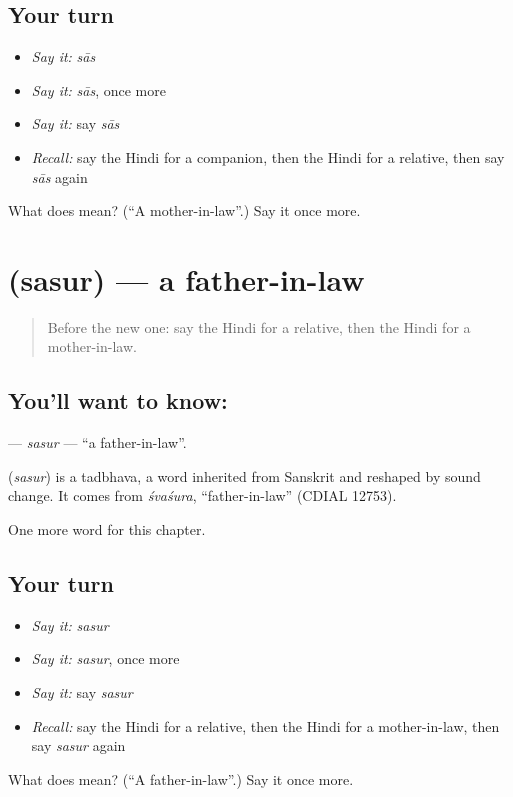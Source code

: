 \subsection*{Your turn}
\begin{itemize}
\raggedright
  \item \emph{Say it:} \emph{sās}
  \item \emph{Say it:} \emph{sās}, once more
  \item \emph{Say it:} say \emph{sās}
  \item \emph{Recall:} say the Hindi for a companion, then the Hindi for a relative, then say \emph{sās} again
\end{itemize}

\begin{tcolorbox}[breakable,colback=teal!4,colframe=teal!35!black,title={Before you move on}]
What does  mean? (\textquotedblleft{}A mother-in-law\textquotedblright{}.) Say it once more.
\end{tcolorbox}
\section[\texorpdfstring{\hi{ससुर} (sasur)}{ससुर (sasur)}]{ (sasur) — a father-in-law}

\label{lesson:HI-C254-sasur}



\begin{quote}
Before the new one: say the Hindi for a relative, then the Hindi for a mother-in-law.
\end{quote}

\subsection*{You'll want to know: }
\textbf{} — \emph{sasur} — \textquotedblleft{}a father-in-law\textquotedblright{}.

\begin{cousinweb}
\textbf{} (\emph{sasur}) is a tadbhava, a word inherited from Sanskrit and reshaped by sound change. It comes from \emph{śvaśura}, \textquotedblleft{}father-in-law\textquotedblright{} (CDIAL 12753).
\end{cousinweb}

\begin{grammarlens}[title={What you've built}]
One more word for this chapter.
\end{grammarlens}

\subsection*{Your turn}
\begin{itemize}
\raggedright
  \item \emph{Say it:} \emph{sasur}
  \item \emph{Say it:} \emph{sasur}, once more
  \item \emph{Say it:} say \emph{sasur}
  \item \emph{Recall:} say the Hindi for a relative, then the Hindi for a mother-in-law, then say \emph{sasur} again
\end{itemize}

\begin{tcolorbox}[breakable,colback=teal!4,colframe=teal!35!black,title={Before you move on}]
What does  mean? (\textquotedblleft{}A father-in-law\textquotedblright{}.) Say it once more.
\end{tcolorbox}
